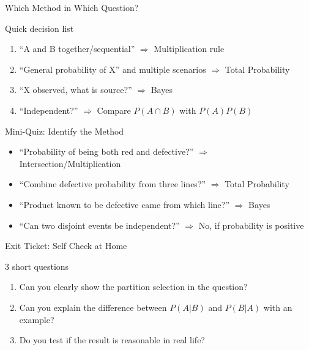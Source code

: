 \documentclass[light]{lutbeamer}
\begin{document}
\begin{frame}{Which Method in Which Question?}
    \begin{block}{Quick decision list}
        \begin{enumerate}
            \item ``A and B together/sequential'' \(\Rightarrow\) Multiplication rule
            \item ``General probability of X'' and multiple scenarios \(\Rightarrow\) Total Probability
            \item ``X observed, what is source?'' \(\Rightarrow\) Bayes
            \item ``Independent?'' \(\Rightarrow\) Compare \(P(A\cap B)\) with \(P(A)P(B)\)
        \end{enumerate}
    \end{block}
\end{frame}

\begin{frame}[fragile]{Mini-Quiz: Identify the Method}
    \begin{itemize}[<+->]
        \item ``Probability of being both red and defective?'' \(\Rightarrow\) Intersection/Multiplication
        \item ``Combine defective probability from three lines?'' \(\Rightarrow\) Total Probability
        \item ``Product known to be defective came from which line?'' \(\Rightarrow\) Bayes
        \item ``Can two disjoint events be independent?'' \(\Rightarrow\) No, if probability is positive
    \end{itemize}
\end{frame}

\begin{frame}{Exit Ticket: Self Check at Home}
    \begin{block}{3 short questions}
        \begin{enumerate}
            \item Can you clearly show the partition selection in the question?
            \item Can you explain the difference between \(P(A|B)\) and \(P(B|A)\) with an example?
            \item Do you test if the result is reasonable in real life?
        \end{enumerate}
    \end{block}
\end{frame}
\end{document}
